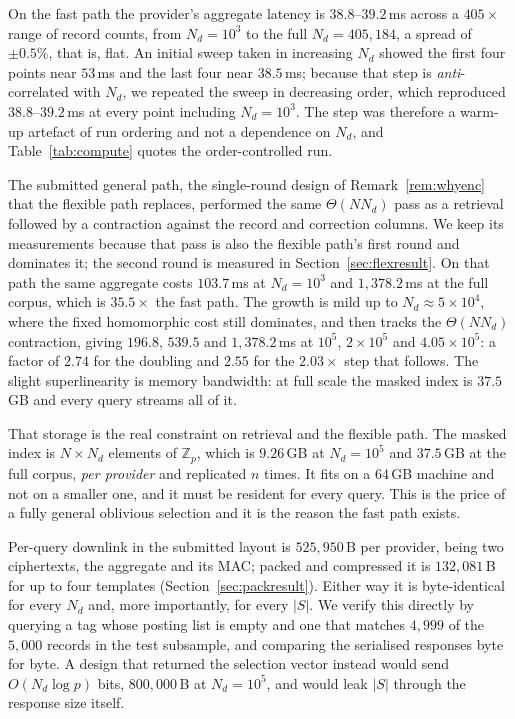\documentclass[a4paper,fleqn]{cas-dc}
\newif\ifauthorchecks
\newcommand{\authorcheck}[1]{\ifauthorchecks{\color{red}\textsf{[Authors: #1]}}\fi}
\begin{document}
On the fast path the provider's aggregate latency is $38.8$--$39.2$\,ms across
a $405\times$ range of record counts, from $N_d=10^3$ to the full
$N_d=405{,}184$, a spread of $\pm0.5\%$, that is, flat. An initial sweep taken
in increasing $N_d$ showed the first four points near $53$\,ms and the last
four near $38.5$\,ms; because that step is \emph{anti}-correlated with $N_d$,
we repeated the sweep in decreasing order, which reproduced
$38.8$--$39.2$\,ms at every point including $N_d=10^3$. The step was therefore
a warm-up artefact of run ordering and not a dependence on $N_d$, and
Table~\ref{tab:compute} quotes the order-controlled run.

The submitted general path, the single-round design of
Remark~\ref{rem:whyenc} that the flexible path replaces, performed the same
$\Theta(NN_d)$ pass as a retrieval followed by a contraction against the
record and correction columns. We keep its measurements because that pass is
also the flexible path's first round and dominates it; the second round is
measured in Section~\ref{sec:flexresult}.
\authorcheck{Re-measure this column in C++ as flexible round one plus round
two.} On that path the same aggregate costs $103.7$\,ms at $N_d=10^3$ and
$1{,}378.2$\,ms at the full corpus, which is $35.5\times$ the fast path. The
growth is mild up to $N_d\approx5\times10^4$, where the fixed homomorphic cost
still dominates, and then tracks the $\Theta(N N_d)$ contraction, giving
$196.8$, $539.5$ and $1{,}378.2$\,ms at $10^5$, $2\times10^5$ and
$4.05\times10^5$: a factor of $2.74$ for the doubling and $2.55$ for the
$2.03\times$ step that follows. The slight superlinearity is memory
bandwidth: at full scale the masked index is $37.5$\,GB and every query
streams all of it.

That storage is the real constraint on retrieval and the flexible path. The
masked index is
$N\times N_d$ elements of $\mathbb{Z}_p$, which is $9.26$\,GB at $N_d=10^5$
and $37.5$\,GB at the full corpus, \emph{per provider} and replicated $n$
times. It fits on a $64$\,GB machine and not on a smaller one, and it must be
resident for every query. This is the price of a fully general oblivious
selection and it is the reason the fast path exists.

Per-query downlink in the submitted layout is $525{,}950$\,B per provider,
being two ciphertexts, the aggregate and its MAC; packed and compressed it is
$132{,}081$\,B for up to four templates (Section~\ref{sec:packresult}). Either
way it is byte-identical for every $N_d$ and, more importantly, for every
$|S|$. We verify this directly by querying a tag whose
posting list is empty and one that matches $4{,}999$ of the $5{,}000$ records
in the test subsample, and comparing the serialised responses byte for byte. A
design that returned the selection vector instead would send $O(N_d\log p)$
bits, $800{,}000$\,B at $N_d=10^5$, and would leak $|S|$ through the response
size itself.
\end{document}

